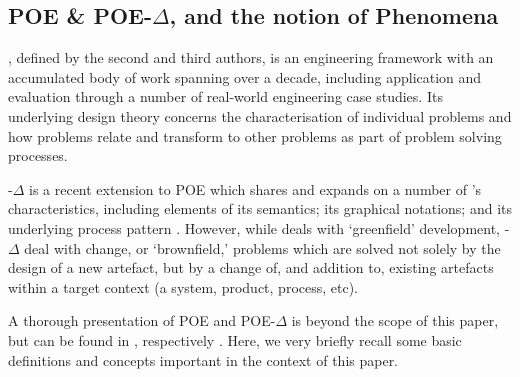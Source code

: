 \documentclass[runningheads,a4paper]{llncs}
\begin{document}
%
%

\subsection{POE \& POE-$\Delta$, and the notion of Phenomena}
\label{subsect:intr.poe}
\POE{}, defined by the second and third authors, is an engineering
framework with an accumulated body of work spanning over a decade,
including application and evaluation through a number of real-world
engineering case studies. Its underlying design theory concerns the
characterisation of individual problems and how problems relate and
transform to other problems as part of problem solving processes.

\POE{}-$\Delta$ is a recent extension to POE which shares and expands
on a number of \POE{}'s characteristics, including elements of its
semantics; its graphical notations; and its underlying process pattern
\cite{Hall2009JAdvSysMeas}. However, while \POE{} deals with
`greenfield' development, \POE{}-$\Delta$ deal with change, or
`brownfield,' problems which are solved not solely by the design of a
new artefact, but by a change of, and addition to, existing artefacts
within a target context (a system, product, process, etc).

A thorough presentation of POE and POE-$\Delta$ is beyond the scope of
this paper, but can be found in \cite{hall2016a-design}, respectively
. Here, we very briefly recall
some basic definitions and concepts important in the context of this
paper.
\end{document}
